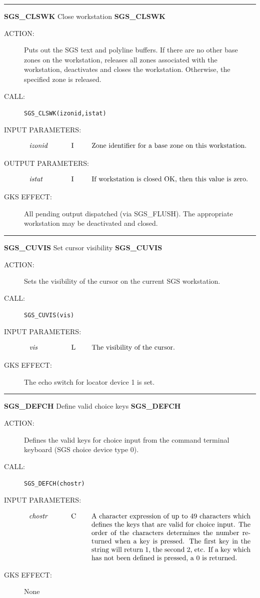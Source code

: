 \documentclass[11pt]{article}
\newcommand{\htmlref}[2]{#1}
\newcommand{\xlabel}[1]{}
\newcommand{\rthead}[2]{\rule{\textwidth}{0.3mm}
{\Large {\bf #1} \hfill #2 \hfill {\bf #1}}}
\newenvironment{params}%
{\[\begin{tabular}{p{0.14\textwidth}p{0.05\textwidth}p{0.66\textwidth}}}%
{\end{tabular}\]}
\newcommand{\rparams}[3]{{\em #1} &#2 &#3\\}
\newcommand{\rthead}[2]{\subsection{\label{#1}\xlabel{#1}#1 - #2}}
\newenvironment{params}{\begin{description}}{\end{description}}
\newcommand{\rparams}[3]{\item{{\em #1}} (#2) #3}
\begin{document}
\rthead{SGS\_CLSWK}{Close workstation}
\begin{description}
\item [ACTION:]
Puts out the SGS text and polyline buffers.
If there are no other base zones on the workstation, releases all zones
associated with the workstation, deactivates and closes the workstation.
Otherwise, the specified zone is released.
\item [CALL:]
{\tt SGS\_CLSWK(izonid,istat)}
\item [INPUT PARAMETERS:]
\begin{params}
\rparams{izonid}{I}{Zone identifier for a base zone on this workstation.}
\end{params}
\item [OUTPUT PARAMETERS:]
\begin{params}
\rparams{istat}{I}{If workstation is closed OK, then this value is zero.}
\end{params}
\item [GKS EFFECT:]
All pending output dispatched (via \htmlref{SGS\_FLUSH}{SGS_FLUSH}).
The appropriate workstation may be deactivated and closed.
\end{description}
\goodbreak

\rthead{SGS\_CUVIS}{Set cursor visibility}
\begin{description}
\item [ACTION:]
Sets the visibility of the cursor on the current SGS workstation.
\item [CALL:]
{\tt SGS\_CUVIS(vis)}
\item [INPUT PARAMETERS:]
\begin{params}
\rparams{vis}{L}{The visibility of the cursor.}
\end{params}
\item [GKS EFFECT:]
The echo switch for locator device 1 is set.
\end{description}
\goodbreak

\rthead{SGS\_DEFCH}{Define valid choice keys}
\begin{description}
\item [ACTION:]
Defines the valid keys for choice input from the command terminal
keyboard (SGS choice device type 0).
\item [CALL:]
{\tt SGS\_DEFCH(chostr)}
\item [INPUT PARAMETERS:]
\begin{params}
\rparams{chostr}{C}{A character expression of up to 49 characters which defines
the keys that are valid for choice input. The order of the characters 
determines the number returned when a key is pressed. The first key in the 
string will return 1, the second 2, etc. If a key which has not been defined
is pressed, a 0 is returned.}
\end{params}
\item [GKS EFFECT:]
None
\end{description}
\goodbreak
\end{document}
